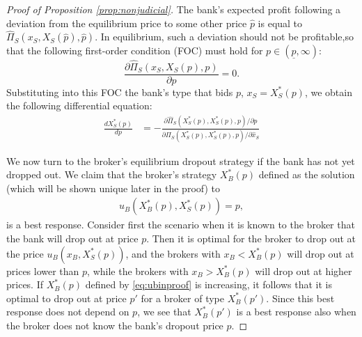 \documentclass[11pt,twopage]{article}
\begin{document}
\begin{proof}[Proof of Proposition \ref{prop:nonjudicial}]
  The bank's expected profit following a deviation from the
  equilibrium price to some other price $\hat{p}$ is equal to $\hat
  \Pi_{S}(x_{S},X_{S}(\hat{p}),\hat{p})$.  In equilibrium, such a
  deviation should not be profitable,so that the following first-order
  condition (FOC) must hold for $p\in(\underline{p},\infty)$:
  \[
  \frac{\partial \hat \Pi_{S}(x_{S},X_{S}(p),p)}{\partial p}=0.
  \]
  Substituting into this FOC the bank's type that bids $p$,
  $x_{S}=X_{S}^*(p)$, we obtain the following differential equation:
  \begin{align}
    \frac{d X_{S}^*(p)}{dp} & =-\frac{\partial\hat
      \Pi_{S}(X_{S}^*(p),X_{S}^*(p),p)/\partial
      p}{\partial\Pi_{S}(X_{S}^*(p),X_{S}^*(p),p)/\partial\hat{x}_{S}}
    \label{eq:ivp}
  \end{align}

  We now turn to the broker's equilibrium dropout strategy if the bank
  has not yet dropped out. We claim that the broker's strategy
  $X_B^*(p)$ defined as the solution (which will be shown unique later
  in the proof) to \begin{align}u_B(X_B^*(p),X_S^*(p)) =
    p,\label{eq:ubinproof}\end{align} is a best response. Consider
  first the scenario when it is known to the broker that the bank will
  drop out at price $p$.  Then it is optimal for the broker to drop
  out at the price $u_B(x_B,X_S^*(p))$, and the brokers with $x_B <
  X_B^*(p)$ will drop out at prices lower than $p$, while the brokers
  with $x_B > X_B^*(p)$ will drop out at higher prices.  If $X_B^*(p)$
  defined by \eqref{eq:ubinproof} is increasing, it follows that it is
  optimal to drop out at price $p'$ for a broker of type $X_B^*(p')$.
  Since this best response does not depend on $p$, we see that
  $X_B^*(p')$ is a best response also when the broker does not know
  the bank's dropout price $p$.


\end{proof}
\end{document}
